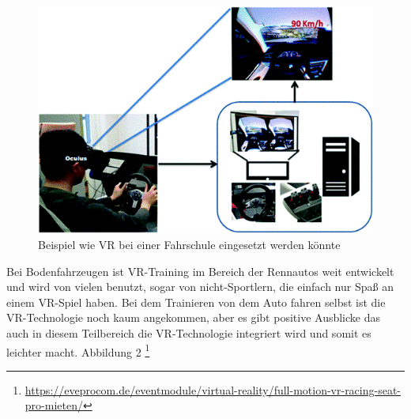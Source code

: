 \begin{figure}[!ht]
    \centering
    \includegraphics[width=1.0\textwidth]{images/Abbildung 3.png}
    \caption{\label{fig:Abbildung 3}Beispiel wie VR bei einer Fahrschule eingesetzt werden könnte\cite{ihemedu2017virtual}\protect
    }
\end{figure}
Bei Bodenfahrzeugen ist VR-Training im Bereich der Rennautos weit entwickelt und wird von vielen benutzt, sogar von nicht-Sportlern, die einfach nur Spaß an einem VR-Spiel haben. Bei dem Trainieren von dem Auto fahren selbst ist die VR-Technologie noch kaum angekommen, aber es gibt positive Ausblicke das auch in diesem Teilbereich die VR-Technologie integriert wird und somit es leichter macht.
Abbildung 2 \footnote{\url{https://eveprocom.de/eventmodule/virtual-reality/full-motion-vr-racing-seat-pro-mieten/}}
